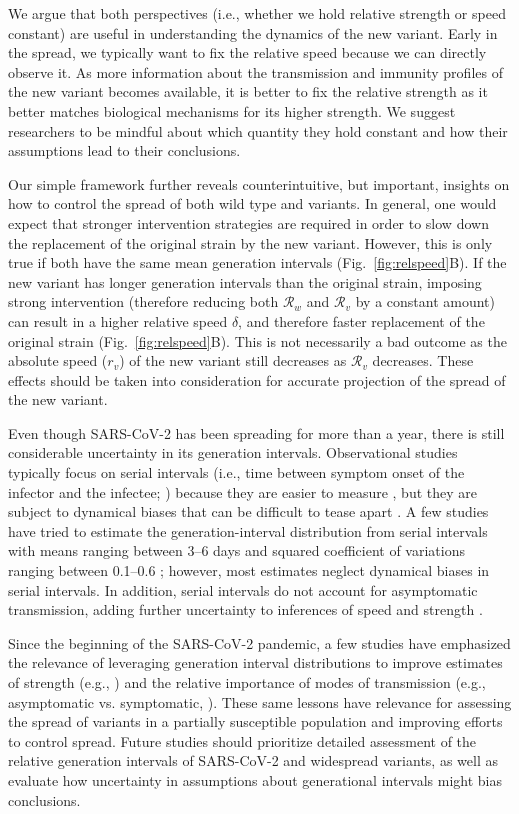 \documentclass[12pt]{article}
\newcommand{\fref}[1]{Fig.~\ref{fig:#1}}
\newcommand{\RR}{\ensuremath{{\mathcal R}}\xspace}
\begin{document}
We argue that both perspectives (i.e., whether we hold relative strength or speed constant) are useful in understanding the dynamics of the new variant.
Early in the spread, we typically want to fix the relative speed because we can directly observe it.
As more information about the transmission and immunity profiles of the new variant becomes available, it is better to fix the relative strength as it better matches biological mechanisms for its higher strength.
We suggest researchers to be mindful about which quantity they hold constant and how their assumptions lead to their conclusions.

Our simple framework further reveals counterintuitive, but important, insights on how to control the spread of both wild type and variants.
In general, one would expect that stronger intervention strategies are required in order to slow down the replacement of the original strain by the new variant.
However, this is only true if both have the same mean generation intervals (\fref{relspeed}B).
If the new variant has longer generation intervals than the original strain, imposing strong intervention (therefore reducing both $\RR_w$ and $\RR_v$ by a constant amount) can result in a higher relative speed $\delta$, and therefore faster replacement of the original strain (\fref{relspeed}B).
This is not necessarily a bad outcome as the absolute speed ($r_v$) of the new variant still decreases as $\RR_v$ decreases.
These effects should be taken into consideration for accurate projection of the spread of the new variant.

Even though SARS-CoV-2 has been spreading for more than a year, there is still considerable uncertainty in its generation intervals.
Observational studies typically focus on serial intervals (i.e., time between symptom onset of the infector and the infectee; \cite{svensson2007note}) because they are easier to measure \citep{griffin2020rapid}, but they are subject to dynamical biases that can be difficult to tease apart \citep{park2021forward}.
A few studies have tried to estimate the generation-interval distribution from serial intervals with means ranging between 3--6 days and squared coefficient of variations ranging between 0.1--0.6 \citep{ferretti2020quantifying,Ferretti2020timing,ganyani2020estimating,knight2020estimating}; 
however, most estimates neglect dynamical biases in serial intervals.
In addition, serial intervals do not account for asymptomatic transmission, adding further uncertainty to inferences of speed and strength \citep{park2020time}.

Since the beginning of the SARS-CoV-2 pandemic, a few studies have emphasized  the relevance of leveraging generation interval distributions to improve estimates of strength (e.g., \cite{doi:10.1098/rsif.2020.0144}) and the relative importance of modes of transmission (e.g., asymptomatic vs. symptomatic, \cite{park2020time}).
These same lessons have relevance for assessing the spread of variants in a partially susceptible population and improving efforts to control spread.
Future studies should prioritize detailed assessment of the relative generation intervals of SARS-CoV-2 and widespread variants, as well as evaluate how uncertainty in assumptions about generational intervals might bias conclusions.


\end{document}
